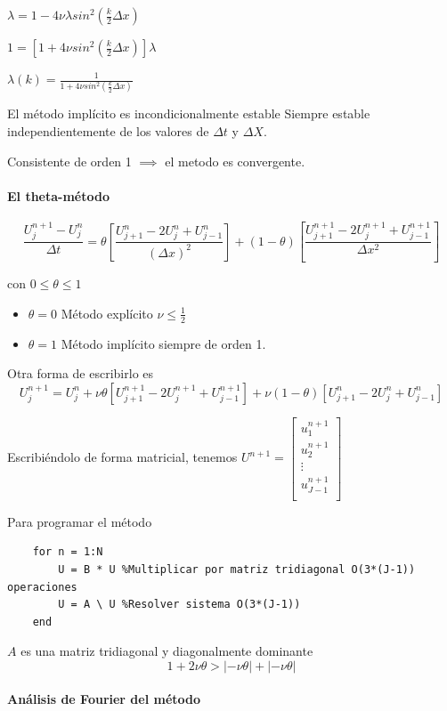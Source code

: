 $\lambda = 1-4\nu\lambda sin^2(\frac{k}{2}\Delta x)$

$1 = [1+4\nu sin^2(\frac{k}{2}\Delta x)]\lambda$

$\lambda(k) = \frac{1}{1+4\nu sin^2(\frac{k}{2}\Delta x)}$


El método implícito es incondicionalmente estable
Siempre estable independientemente de los valores de $\Delta t$ y $\Delta X$.

Consistente de orden 1 $\implies$ el metodo es convergente.

\paragraph{El theta-método}

$$\frac{U_j^{n+1}-U_j^n}{\Delta t} = 
\theta \left[ \frac{U_{j+1}^n-2U_j^n+U_{j-1}^n}{(\Delta x)^2}\right] +
(1-\theta)\left[\frac{U_{j+1}^{n+1}-2U_{j}^{n+1}+U_{j-1}^{n+1}}{\Delta x^2}\right]$$

con $0\le\theta\le 1$

\begin{itemize}
\item $\theta = 0$ Método explícito $\nu \le \frac{1}{2}$
\item $\theta = 1$ Método implícito siempre de orden 1.
\end{itemize}

Otra forma de escribirlo es
$$U_j^{n+1} = U_j^n + \nu\theta\left[U_{j+1}^{n+1} - 2U_{j}^{n+1} + U_{j-1}^{n+1}\right] + \nu(1-\theta)\left[U_{j+1}^{n}-2U_{j}^{n}+U_{j-1}^{n}\right]$$

Escribiéndolo de forma matricial, tenemos
$U^{n+1} = 
\begin{bmatrix}
u_1^{n+1}\\
u_2^{n+1}\\
\vdots\\
u_{J-1}^{n+1}\\
\end{bmatrix}$

Para programar el método

\begin{lstlisting}
	for n = 1:N
		U = B * U %Multiplicar por matriz tridiagonal O(3*(J-1)) operaciones
		U = A \ U %Resolver sistema O(3*(J-1))
	end
\end{lstlisting}
$A$ es una matriz tridiagonal y diagonalmente dominante
$$1+2\nu\theta > |-\nu\theta| + |-\nu\theta|$$

\paragraph*{Análisis de Fourier del método}

